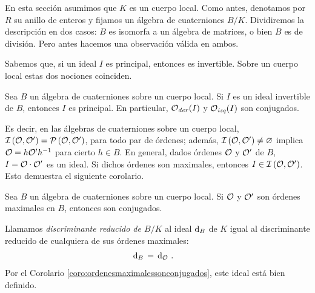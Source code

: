 % 
En esta secci\'{o}n asumimos que $K$ es un cuerpo local. Como antes, denotamos
por $R$ su anillo de enteros y fijamos un \'{a}lgebra de cuaterniones $B/K$.
Dividiremos la descripci\'{o}n en dos casos: $B$ es isomorfa a un \'{a}lgebra
de matrices, o bien $B$ es de divisi\'{o}n. Pero antes hacemos una
observaci\'{o}n v\'{a}lida en ambos.

Sabemos que, si un ideal $I$ es principal, entonces es invertible. Sobre un
cuerpo local estas dos nociones coinciden.

\begin{propoInvertibleImplicaPrincipal}%
	\label{propo:invertibleimplicaprincipal}
	Sea $B$ un \'{a}lgebra de cuaterniones sobre un cuerpo local. Si $I$ es
	un ideal invertible de $B$, entonces $I$ es principal. En particular,
	$\Oder(I)$ y $\Oizq(I)$ son conjugados.
\end{propoInvertibleImplicaPrincipal}

Es decir, en las \'{a}lgebras de cuaterniones sobre un cuerpo local,
$\ideales{\cal{O},\cal{O}'}=\ppales{\cal{O},\cal{O}'}$, para todo par de
\'{o}rdenes; adem\'{a}s, $\ideales{\cal{O},\cal{O}'}\not=\varnothing$ implica
$\cal{O}=h\cal{O}'h^{-1}$ para cierto $h\in B$. En general, dados \'{o}rdenes
$\cal{O}$ y $\cal{O}'$ de $B$, $I=\cal{O}\cdot\cal{O}'$ es un ideal. Si dichos
\'{o}rdenes son maximales, entonces $I\in\ideales{\cal{O},\cal{O}'}$. Esto
demuestra el siguiente corolario.

\begin{coroOrdenesMaximalesSonConjugados}%
	\label{coro:ordenesmaximalessonconjugados}
	Sea $B$ un \'{a}lgebra de cuaterniones sobre un cuerpo local. Si
	$\cal{O}$ y $\cal{O}'$ son \'{o}rdenes maximales en $B$, entonces son
	conjugados.
\end{coroOrdenesMaximalesSonConjugados}

Llamamos \emph{discriminante reducido de $B/K$} al ideal $\drd{B}$ de $K$ igual
al discriminante reducido de cualquiera de sus \'{o}rdenes maximales:
\begin{align*}
	\drd{B} & \,=\,\drd{\cal{O}}
	\text{ .}
\end{align*}
%
Por el Corolario \ref{coro:ordenesmaximalessonconjugados}, este ideal est\'{a}
bien definido.


